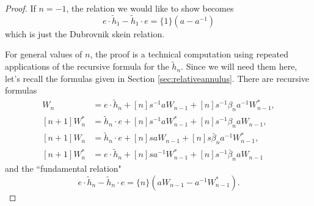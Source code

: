 \begin{proof}
If $n=-1$, the relation we would like to show becomes 
\begin{equation*}
e \cdot \tilde{h}_1 - \tilde{h}_1 \cdot e = \{1\} \left( a - a^{-1} \right)
\end{equation*}
which is just the Dubrovnik skein relation. 

For general values of $n$, the proof is a technical computation using repeated applications of the recursive formula for the $\tilde{h}_n$. Since we will need them here, let's recall the formulas given in Section \ref{sec:relativeannulus}. There are recursive formulas
\begin{align}
[n+1] W_n &= e \cdot \tilde{h}_n + [n] s^{-1} a W_{n-1} + [n] s^{-1} \beta_n a^{-1} W^*_{n-1}, \label{eq:r1} \\
[n+1] W^*_n &= \tilde{h}_n \cdot e + [n] s^{-1} a W^*_{n-1} + [n] s^{-1} \beta_n a W_{n-1}, \label{eq:r2} \\
[n+1] W_n &= \tilde{h}_n \cdot e + [n] s a W_{n-1} + [n] s \bar{\beta}_n a^{-1} W^*_{n-1}, \label{eq:r3} \\
[n+1] W^*_n &= e \cdot \tilde{h}_n + [n] s a^{-1} W^*_{n-1} + [n] s^{-1} \bar{\beta}_n a W_{n-1} \label{eq:r4}
\end{align}
and the ``fundamental relation"
\begin{equation}
e \cdot \tilde{h}_n - \tilde{h}_n \cdot e = \{n\} (a W_{n-1} - a^{-1} W^*_{n-1}). \label{eq:f}
\end{equation}


\end{proof}
